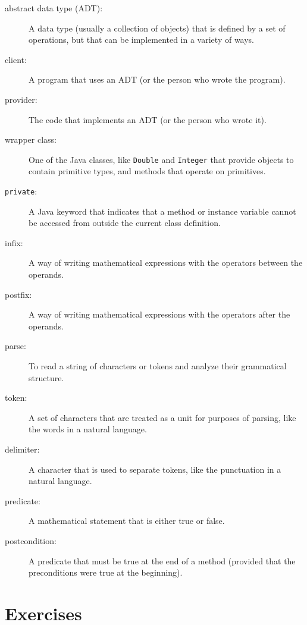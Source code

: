 \begin{description}

\item[abstract data type (ADT):]  A data type (usually a collection
of objects) that is defined by a set of operations, but that can
be implemented in a variety of ways.

\item[client:]  A program that uses an ADT (or the person who wrote
the program).

\item[provider:]  The code that implements an ADT (or the person
who wrote it).

\item[wrapper class:]  One of the Java classes, like {\tt Double}
and {\tt Integer} that provide objects to contain primitive types,
and methods that operate on primitives.

\item[{\tt private}:]  A Java keyword that indicates that a method
or instance variable cannot be accessed from outside the current
class definition.

\item[infix:]  A way of writing mathematical expressions with the
operators between the operands.

\item[postfix:]  A way of writing mathematical expressions with the
operators after the operands.

\item[parse:]  To read a string of characters or tokens and analyze
their grammatical structure.

\item[token:]  A set of characters that are treated as a unit for
purposes of parsing, like the words in a natural language.

\item[delimiter:]  A character that is used to separate tokens,
like the punctuation in a natural language.

\item[predicate:]  A mathematical statement that is either true or
false.

\item[postcondition:]  A predicate that must be true at the end of
a method (provided that the preconditions were true at the
beginning).


\end{description}


\section{Exercises}

